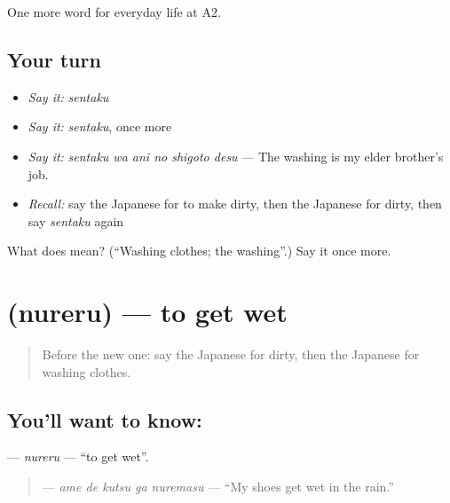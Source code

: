\begin{grammarlens}[title={What you've built}]
One more word for everyday life at A2.
\end{grammarlens}

\subsection*{Your turn}
\begin{itemize}
\raggedright
  \item \emph{Say it:} \emph{sentaku}
  \item \emph{Say it:} \emph{sentaku}, once more
  \item \emph{Say it:} \emph{sentaku wa ani no shigoto desu} — The washing is my elder brother's job.
  \item \emph{Recall:} say the Japanese for to make dirty, then the Japanese for dirty, then say \emph{sentaku} again
\end{itemize}

\begin{tcolorbox}[breakable,colback=teal!4,colframe=teal!35!black,title={Before you move on}]
What does  mean? (\textquotedblleft{}Washing clothes; the washing\textquotedblright{}.) Say it once more.
\end{tcolorbox}
\section[\texorpdfstring{\ja{ぬれる} (nureru)}{ぬれる (nureru)}]{ (nureru) — to get wet}

\label{lesson:JA-C161-nureru}



\begin{quote}
Before the new one: say the Japanese for dirty, then the Japanese for washing clothes.
\end{quote}

\subsection*{You'll want to know: }
\textbf{} — \emph{nureru} — \textquotedblleft{}to get wet\textquotedblright{}.

\begin{quote}
\textbf{  } — \emph{ame de kutsu ga nuremasu} — \textquotedblleft{}My shoes get wet in the rain.\textquotedblright{}
\end{quote}

